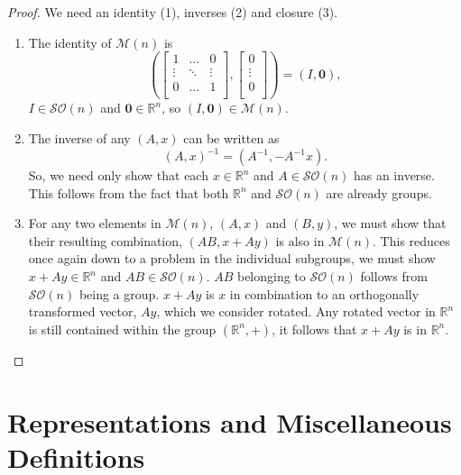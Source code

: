 \documentclass{article}
\begin{document}
\begin{proof}
    We need an identity (1), inverses (2) and closure (3). \par
\begin{enumerate}
    \item The identity of $\mathcal{M}(n)$ is 
    \[ 
        \left( 
            \begin{bmatrix} 1 & \ldots & 0 \\
                \vdots & \ddots & \vdots \\
                0 & \ldots & 1 \\
            \end{bmatrix} ,
            \begin{bmatrix}0 \\ \vdots \\ 0 \\ \end{bmatrix}\right)
            = 
            \left(I, \mathbf{0} \right) ,
    \] 
    $I \in \mathcal{SO}(n)$ and $\mathbf{0} \in \mathbb{R}^{n}$, so $(I, \mathbf{0}) \in \mathcal{M}(n)$. \par
    \item The inverse of any $(A,x)$ can be written as
        \[%
            (A,x)^{-1} = (A^{-1}, -A^{-1}x) .
        \]%
        So, we need only show that each $x \in \mathbb{R}^{n}$ and $A \in \mathcal{SO}(n)$ has an inverse. This follows from the fact that both $\mathbb{R}^{n}$ and $\mathcal{SO}(n)$ are already groups. \par
    \item For any two elements in $\mathcal{M}(n)$, $(A,x)$ and $(B,y)$, we must show that their resulting combination, $(AB,x+Ay)$ is also in $\mathcal{M}(n)$. This reduces once again down to a problem in the individual subgroups, we must show $x+Ay \in \mathbb{R}^{n}$ and $AB \in \mathcal{SO}(n)$. $AB$ belonging to $\mathcal{SO}(n)$ follows from $\mathcal{SO}(n)$ being a group. $x+Ay$ is $x$ in combination to an orthogonally transformed vector, $Ay$, which we consider rotated. Any rotated vector in $\mathbb{R}^{n}$ is still contained within the group $(\mathbb{R}^{n},+)$, it follows that $x+Ay$ is in $\mathbb{R}^{n}$. \end{enumerate}
\end{proof}

\section{Representations and Miscellaneous Definitions} 
\end{document}
